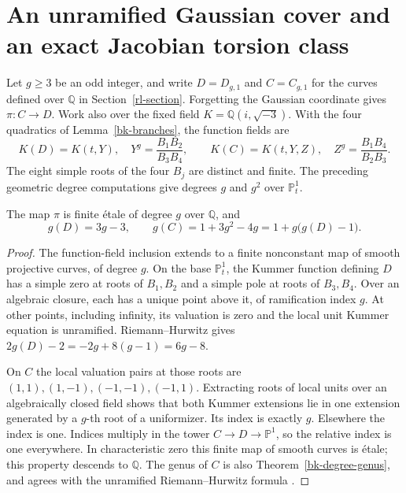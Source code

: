 \section{An unramified Gaussian cover and an exact Jacobian torsion class}
\label{ug-section}

Let $g\geq3$ be an odd integer, and write $D=D_{g,1}$ and
$C=C_{g,1}$ for the curves defined over $\mathbb Q$ in
Section~\ref{rl-section}. Forgetting the Gaussian coordinate gives
$\pi:C\to D$. Work also over the fixed field
$K=\mathbb Q(i,\sqrt{-3})$. With the four quadratics of
Lemma~\ref{bk-branches}, the function fields are
\begin{equation}\label{ug-fields}
 K(D)=K(t,Y),\quad Y^g=\frac{B_1B_2}{B_3B_4},\qquad
 K(C)=K(t,Y,Z),\quad Z^g=\frac{B_1B_4}{B_2B_3}.
\end{equation}
The eight simple roots of the four $B_j$ are distinct and finite.
The preceding geometric degree computations give degrees $g$ and
$g^2$ over $\mathbb P^1_t$.

\begin{theorem}
\label{ug-etale}
The map $\pi$ is finite \'etale of degree $g$ over $\mathbb Q$, and
\begin{equation}\label{ug-genera}
 g(D)=3g-3,\qquad g(C)=1+3g^2-4g=1+g\bigl(g(D)-1\bigr).
\end{equation}
\end{theorem}
\begin{proof}
The function-field inclusion extends to a finite nonconstant map
of smooth projective curves, of degree $g$.
On the base $\mathbb P^1_t$, the Kummer function defining $D$
has a simple zero at roots of $B_1,B_2$
and a simple pole at roots of $B_3,B_4$. Over an algebraic closure,
each has a unique point above it, of ramification index $g$.
At other points, including infinity, its valuation is zero and the
local unit Kummer equation is unramified. Riemann--Hurwitz gives
$2g(D)-2=-2g+8(g-1)=6g-8$.

On $C$ the local valuation pairs at those roots are
$(1,1),(1,-1),(-1,-1),(-1,1)$. Extracting roots of local units over
an algebraically closed field shows that both Kummer extensions
lie in one extension generated by a $g$-th root of a uniformizer.
Its index is exactly $g$. Elsewhere the index is one.
Indices multiply in the tower $C\to D\to\mathbb P^1$, so the
relative index is one everywhere. In characteristic zero this
finite map of smooth curves is \'etale; this property descends to
$\mathbb Q$. The genus of $C$ is also
Theorem~\ref{bk-degree-genus}, and agrees with the unramified
Riemann--Hurwitz formula \cite{StacksCurves2026}.
\end{proof}

